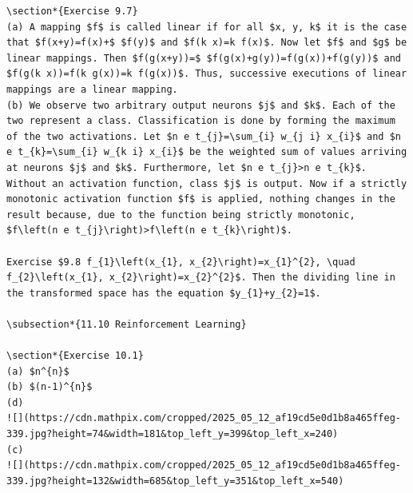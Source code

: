 \documentclass[10pt]{book}
\begin{document}
\begin{center}
\begin{enumerate}
\begin{center}
\begin{center}
\begin{center}
\begin{center}
\begin{center}
\begin{verbatim}
\section*{Exercise 9.7}
(a) A mapping $f$ is called linear if for all $x, y, k$ it is the case that $f(x+y)=f(x)+$ $f(y)$ and $f(k x)=k f(x)$. Now let $f$ and $g$ be linear mappings. Then $f(g(x+y))=$ $f(g(x)+g(y))=f(g(x))+f(g(y))$ and $f(g(k x))=f(k g(x))=k f(g(x))$. Thus, successive executions of linear mappings are a linear mapping.
(b) We observe two arbitrary output neurons $j$ and $k$. Each of the two represent a class. Classification is done by forming the maximum of the two activations. Let $n e t_{j}=\sum_{i} w_{j i} x_{i}$ and $n e t_{k}=\sum_{i} w_{k i} x_{i}$ be the weighted sum of values arriving at neurons $j$ and $k$. Furthermore, let $n e t_{j}>n e t_{k}$. Without an activation function, class $j$ is output. Now if a strictly monotonic activation function $f$ is applied, nothing changes in the result because, due to the function being strictly monotonic, $f\left(n e t_{j}\right)>f\left(n e t_{k}\right)$.

Exercise $9.8 f_{1}\left(x_{1}, x_{2}\right)=x_{1}^{2}, \quad f_{2}\left(x_{1}, x_{2}\right)=x_{2}^{2}$. Then the dividing line in the transformed space has the equation $y_{1}+y_{2}=1$.

\subsection*{11.10 Reinforcement Learning}

\section*{Exercise 10.1}
(a) $n^{n}$
(b) $(n-1)^{n}$
(d)
![](https://cdn.mathpix.com/cropped/2025_05_12_af19cd5e0d1b8a465ffeg-339.jpg?height=74&width=181&top_left_y=399&top_left_x=240)
(c)
![](https://cdn.mathpix.com/cropped/2025_05_12_af19cd5e0d1b8a465ffeg-339.jpg?height=132&width=685&top_left_y=351&top_left_x=540)


\end{verbatim}
\end{center}
\end{center}
\end{center}
\end{center}
\end{center}
\end{enumerate}
\end{center}
\end{document}
